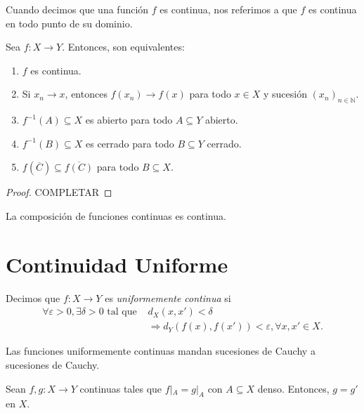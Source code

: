 Cuando decimos que una función $f$ es continua, nos referimos a que $f$ es continua en todo punto de su dominio.

\begin{proposition}
	Sea $f : X \to Y$. Entonces, son equivalentes:
	\begin{enumerate}
		\item $f$ es continua.
		\item Si $x_n \longrightarrow x$, entonces $f(x_n) \longrightarrow f(x)$ para todo $x \in X$ y sucesión $(x_n)_{n \in \mathbb{N}}$.
		\item $f^{-1} (A) \subseteq X$ es abierto para todo $A \subseteq Y$ abierto.
		\item $f^{-1} (B) \subseteq X$ es cerrado para todo $B \subseteq Y$ cerrado.
		\item $f( \overline{C} ) \subseteq \overline{f(C)}$ para todo $B \subseteq X$.
	\end{enumerate}
\end{proposition}

\begin{proof}
	\color{red} COMPLETAR
\end{proof}

\begin{proposition}
	La composición de funciones continuas es continua.
\end{proposition}

\section{Continuidad Uniforme}

\begin{definition}
	Decimos que $f : X \to Y$ es \emph{uniformemente continua} si
	\begin{equation*}
		\begin{split}
			\forall \varepsilon > 0, \exists \delta > 0 \text{ tal que } & d_X(x,x') < \delta \\ &\Rightarrow d_Y(f(x), f(x')) < \varepsilon, \forall x, x' \in X.
		\end{split}
	\end{equation*}
\end{definition}

\begin{remark}
	Las funciones uniformemente continuas mandan sucesiones de Cauchy a sucesiones de Cauchy.
\end{remark}

\begin{proposition}
	Sean $f, g : X \to Y$ continuas tales que $f |_A = g|_A$ con $A \subseteq X$ denso. Entonces, $g = g'$ en $X$.
\end{proposition}

